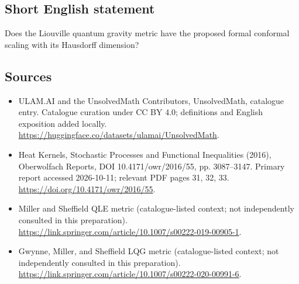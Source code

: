 \documentclass[11pt]{article}
\begin{document}
\subsection{Short English statement}
Does the Liouville quantum gravity metric have the proposed formal conformal scaling with its Hausdorff dimension?
\subsection{Sources}
\begin{itemize}
\item[\hypertarget{source:statement:1}{S1}] ULAM.AI and the UnsolvedMath Contributors, UnsolvedMath, catalogue entry. Catalogue curation under CC BY 4.0; definitions and English exposition added locally.
\url{https://huggingface.co/datasets/ulamai/UnsolvedMath}.
\item[\hypertarget{source:statement:2}{S2}] Heat Kernels, Stochastic Processes and Functional Inequalities (2016), Oberwolfach Reports, DOI 10.4171/owr/2016/55, pp. 3087--3147. Primary report accessed 2026-10-11; relevant PDF pages 31, 32, 33.
\url{https://doi.org/10.4171/owr/2016/55}.
\item[\hypertarget{source:statement:3}{S3}] Miller and Sheffield QLE metric (catalogue-listed context; not independently consulted in this preparation).
\url{https://link.springer.com/article/10.1007/s00222-019-00905-1}.
\item[\hypertarget{source:statement:4}{S4}] Gwynne, Miller, and Sheffield LQG metric (catalogue-listed context; not independently consulted in this preparation).
\url{https://link.springer.com/article/10.1007/s00222-020-00991-6}.
\end{itemize}
\label{end:statement}
\end{document}
